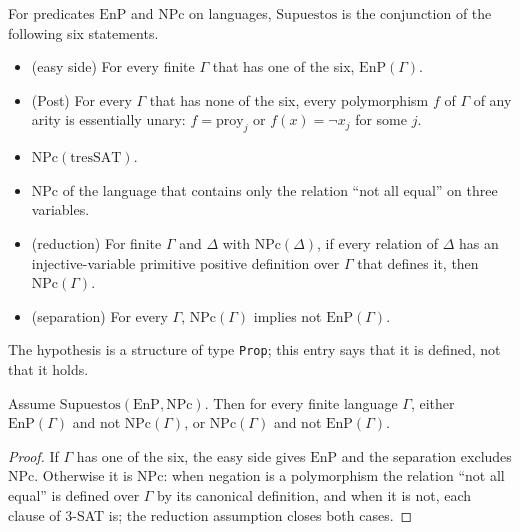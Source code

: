 \begin{definition}
  \label{def:structure-supuestos}
  \leanok
  For predicates $\mathrm{EnP}$ and $\mathrm{NPc}$ on languages, $\mathrm{Supuestos}$ is the
  conjunction of the following six statements.
  \begin{itemize}
    \item (easy side) For every finite $\Gamma$ that has one of the six, $\mathrm{EnP}(\Gamma)$.
    \item (Post) For every $\Gamma$ that has none of the six, every polymorphism $f$ of $\Gamma$ of
      any arity is essentially unary: $f = \mathrm{proy}_j$ or $f(x) = \lnot x_j$ for some $j$.
    \item $\mathrm{NPc}(\mathrm{tresSAT})$.
    \item $\mathrm{NPc}$ of the language that contains only the relation ``not all equal'' on
      three variables.
    \item (reduction) For finite $\Gamma$ and $\Delta$ with $\mathrm{NPc}(\Delta)$, if every
      relation of $\Delta$ has an injective-variable primitive positive definition over $\Gamma$
      that defines it, then $\mathrm{NPc}(\Gamma)$.
    \item (separation) For every $\Gamma$, $\mathrm{NPc}(\Gamma)$ implies not $\mathrm{EnP}(\Gamma)$.
  \end{itemize}
  The hypothesis is a structure of type \texttt{Prop}; this entry says that it is defined, not that
  it holds.
  \own{}
\end{definition}

\begin{theorem}
  \label{thm:structure-dicotomia}
  \leanok
  Assume $\mathrm{Supuestos}(\mathrm{EnP}, \mathrm{NPc})$. Then for every finite language $\Gamma$,
  either $\mathrm{EnP}(\Gamma)$ and not $\mathrm{NPc}(\Gamma)$, or $\mathrm{NPc}(\Gamma)$ and not
  $\mathrm{EnP}(\Gamma)$.
\end{theorem}

\begin{proof}
  \leanok
  If $\Gamma$ has one of the six, the easy side gives $\mathrm{EnP}$ and the separation excludes
  $\mathrm{NPc}$. Otherwise it is $\mathrm{NPc}$: when negation is a polymorphism the relation ``not
  all equal'' is defined over $\Gamma$ by its canonical definition, and when it is not, each clause
  of 3-SAT is; the reduction assumption closes both cases.
\end{proof}

